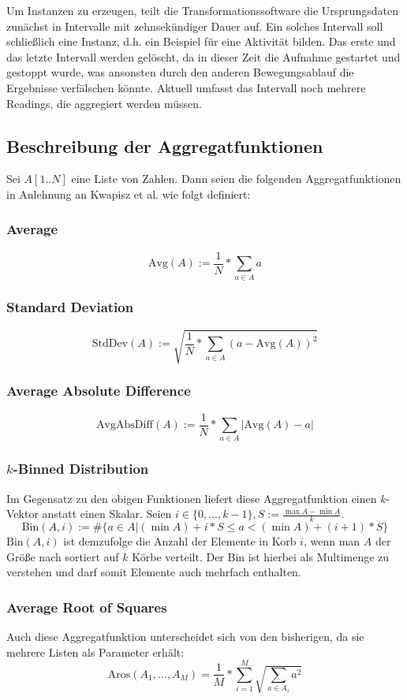 Um Instanzen zu erzeugen, teilt die Transformationssoftware die Ursprungsdaten zunächst in Intervalle mit zehnsekündiger Dauer auf. Ein solches Intervall soll schließlich eine Instanz, d.h. ein Beispiel für eine Aktivität bilden. Das erste und das letzte Intervall werden gelöscht, da in dieser Zeit die Aufnahme gestartet und gestoppt wurde, was ansonsten durch den anderen Bewegungsablauf die Ergebnisse verfälschen könnte. Aktuell umfasst das Intervall noch mehrere Readings, die aggregiert werden müssen.

\subsection{Beschreibung der Aggregatfunktionen}
Sei $A[1..N]$ eine Liste von Zahlen. Dann seien die folgenden Aggregatfunktionen in Anlehnung an Kwapisz et al.\cite{Kwapisz2011} wie folgt definiert:
\subsubsection{Average}
\[
\text{Avg}(A) := \frac{1}{N} * \sum_{a \in A} a
\]
\subsubsection{Standard Deviation}
\[
\text{StdDev}(A) := \sqrt{\frac{1}{N} * \sum_{a \in A} (a - \text{Avg}(A))^2}
\]
\subsubsection{Average Absolute Difference}
\[
\text{AvgAbsDiff}(A) := \frac{1}{N} * \sum_{a \in A} |\text{Avg}(A) - a|
\]
\subsubsection{$k$-Binned Distribution}
Im Gegensatz zu den obigen Funktionen liefert diese Aggregatfunktion einen $k$-Vektor anstatt einen Skalar. Seien $i \in \{0, ..., k - 1\}, S := \frac{\max A - \min A}{k}$.
\[
\text{Bin}(A, i) := \#\{a \in A | (\min A) + i * S \leq a < (\min A) + (i + 1) * S\}
\]
$\text{Bin}(A, i)$ ist demzufolge die Anzahl der Elemente in Korb $i$, wenn man $A$ der Größe nach sortiert auf $k$ Körbe verteilt. Der Bin ist hierbei als Multimenge zu verstehen und darf somit Elemente auch mehrfach enthalten.
\subsubsection{Average Root of Squares}
Auch diese Aggregatfunktion unterscheidet sich von den bisherigen, da sie mehrere Listen als Parameter erhält:
\[
\text{Aros}(A_1, ..., A_M) = \frac{1}{M} * \sum_{i = 1}^{M} \sqrt{\sum_{a \in A_i} a^2}
\]
